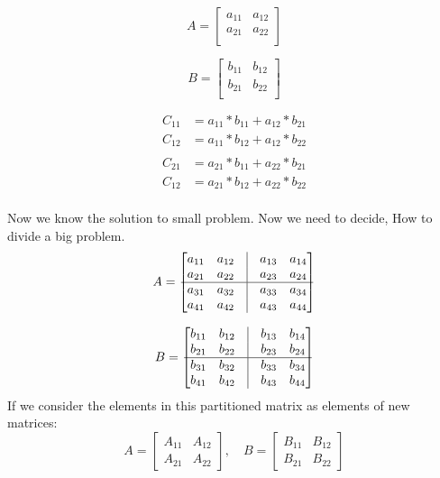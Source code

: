 \documentclass[11pt, a4paper]{article}
\begin{document}
\[A = \left[\begin{matrix}
    a_{11} & a_{12} \\
    a_{21} & a_{22}\\
\end{matrix}\right]\]

\[B = \left[\begin{matrix}
    b_{11} & b_{12} \\
    b_{21} & b_{22}\\
\end{matrix}\right]\]

\begin{align*}
    C_{11} &= a_{11} * b_{11} + a_{12} * b_{21}\\
    C_{12} &= a_{11} * b_{12} + a_{12} * b_{22}\\
    \\
    C_{21} &= a_{21} * b_{11} + a_{22} * b_{21}\\
    C_{12} &= a_{21} * b_{12} + a_{22} * b_{22}\\
\end{align*}

Now we know the solution to small problem.
Now we need to decide, How to divide a big problem.
\[A = \left[\begin{matrix}
    a_{11} & a_{12} & \vline & a_{13} & a_{14} \\
    a_{21} & a_{22} & \vline & a_{23} & a_{24} \\
    \hline
    a_{31} & a_{32} & \vline & a_{33} & a_{34} \\
    a_{41} & a_{42} & \vline & a_{43} & a_{44} \\
\end{matrix}\right]\]

\[B = \left[\begin{matrix}
    b_{11} & b_{12} & \vline & b_{13} & b_{14} \\
    b_{21} & b_{22} & \vline & b_{23} & b_{24} \\
    \hline
    b_{31} & b_{32} & \vline & b_{33} & b_{34} \\
    b_{41} & b_{42} & \vline & b_{43} & b_{44} \\
\end{matrix}\right]\]
If we consider the elements in this partitioned matrix as elements of new matrices:
\[A = \begin{bmatrix}
    A_{11} & A_{12} \\
    A_{21} & A_{22}
\end{bmatrix}, \quad
B = \begin{bmatrix}
    B_{11} & B_{12} \\
    B_{21} & B_{22}
\end{bmatrix}\]
\end{document}
